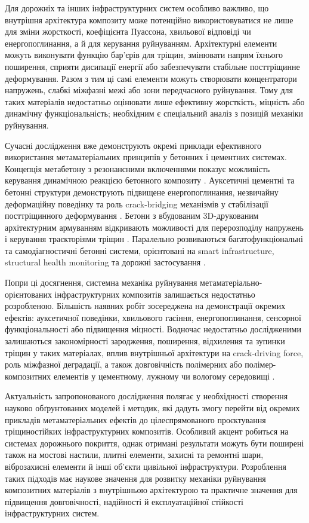 \documentclass[12pt,a4paper]{article}
\begin{document}
Для дорожніх та інших інфраструктурних систем особливо важливо, що внутрішня архітектура композиту може потенційно використовуватися не лише для зміни жорсткості, коефіцієнта Пуассона, хвильової відповіді чи енергопоглинання, а й для керування руйнуванням. Архітектурні елементи можуть виконувати функцію бар'єрів для тріщин, змінювати напрям їхнього поширення, сприяти дисипації енергії або забезпечувати стабільне посттріщинне деформування. Разом з тим ці самі елементи можуть створювати концентратори напружень, слабкі міжфазні межі або зони передчасного руйнування. Тому для таких матеріалів недостатньо оцінювати лише ефективну жорсткість, міцність або динамічну функціональність; необхідним є спеціальний аналіз з позицій механіки руйнування.

Сучасні дослідження вже демонструють окремі приклади ефективного використання метаматеріальних принципів у бетонних і цементних системах. Концепція метабетону з резонансними включеннями показує можливість керування динамічною реакцією бетонного композиту \cite{Mitchell2014}. Ауксетичні цементні та бетонні структури демонструють підвищене енергопоглинання, незвичайну деформаційну поведінку та роль crack-bridging механізмів у стабілізації посттріщинного деформування \cite{Xu2020,Xie2025,Chen2024,Vo2025}. Бетони з вбудованим 3D-друкованим архітектурним армуванням відкривають можливості для перерозподілу напружень і керування траєкторіями тріщин \cite{Vandadi2025}. Паралельно розвиваються багатофункціональні та самодіагностичні бетонні системи, орієнтовані на smart infrastructure, structural health monitoring та дорожні застосування \cite{Dong2023,Qin2024,Barri2023}.

Попри ці досягнення, системна механіка руйнування метаматеріально-орієнтованих інфраструктурних композитів залишається недостатньо розробленою. Більшість наявних робіт зосереджена на демонстрації окремих ефектів: ауксетичної поведінки, хвильового гасіння, енергопоглинання, сенсорної функціональності або підвищення міцності. Водночас недостатньо дослідженими залишаються закономірності зародження, поширення, відхилення та зупинки тріщин у таких матеріалах, вплив внутрішньої архітектури на crack-driving force, роль міжфазної деградації, а також довговічність полімерних або полімер-композитних елементів у цементному, лужному чи вологому середовищі \cite{Zhang2025,Jipa2022}.

Актуальність запропонованого дослідження полягає у необхідності створення науково обґрунтованих моделей і методик, які дадуть змогу перейти від окремих прикладів метаматеріальних ефектів до цілеспрямованого проєктування тріщиностійких інфраструктурних композитів. Особливий акцент робиться на системах дорожнього покриття, однак отримані результати можуть бути поширені також на мостові настили, плитні елементи, захисні та ремонтні шари, віброзахисні елементи й інші об'єкти цивільної інфраструктури. Розроблення таких підходів має наукове значення для розвитку механіки руйнування композитних матеріалів з внутрішньою архітектурою та практичне значення для підвищення довговічності, надійності й експлуатаційної стійкості інфраструктурних систем.
\end{document}
